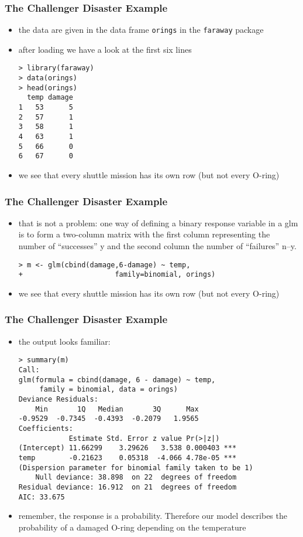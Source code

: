 \begin{frame}[fragile]\frametitle{The Challenger Disaster Example}
\begin{itemize}
\item the data are given in the data frame \texttt{orings} in the \texttt{faraway} package
\item after loading we have a look at the first six lines
\begin{verbatim}
> library(faraway)
> data(orings)
> head(orings)
  temp damage
1   53      5
2   57      1
3   58      1
4   63      1
5   66      0
6   67      0
\end{verbatim}
\item we see that every shuttle mission has its own row (but not every O-ring)
\end{itemize}
\end{frame}

\begin{frame}[fragile]\frametitle{The Challenger Disaster Example}
\begin{itemize}
\item that is not a problem: one way of defining a binary response variable in a glm is to form a two-column matrix with the first
column representing the number of “successes” y and the second column the number of “failures” n–y.
\begin{verbatim}
> m <- glm(cbind(damage,6-damage) ~ temp,
+                      family=binomial, orings)
\end{verbatim}
\normalsize
\item we see that every shuttle mission has its own row (but not every O-ring)
\end{itemize}
\end{frame}

\begin{frame}[fragile]\frametitle{The Challenger Disaster Example}
\begin{itemize}
\item the output looks familiar:\footnotesize
\begin{verbatim}
> summary(m)
Call:
glm(formula = cbind(damage, 6 - damage) ~ temp, 
     family = binomial, data = orings)
Deviance Residuals: 
    Min       1Q   Median       3Q      Max  
-0.9529  -0.7345  -0.4393  -0.2079   1.9565  
Coefficients:
            Estimate Std. Error z value Pr(>|z|)    
(Intercept) 11.66299    3.29626   3.538 0.000403 ***
temp        -0.21623    0.05318  -4.066 4.78e-05 ***
(Dispersion parameter for binomial family taken to be 1)
    Null deviance: 38.898  on 22  degrees of freedom
Residual deviance: 16.912  on 21  degrees of freedom
AIC: 33.675
\end{verbatim}
\item remember, the response is a probability. Therefore our model describes the probability of a damaged O-ring depending on the temperature
\end{itemize}
\end{frame}


